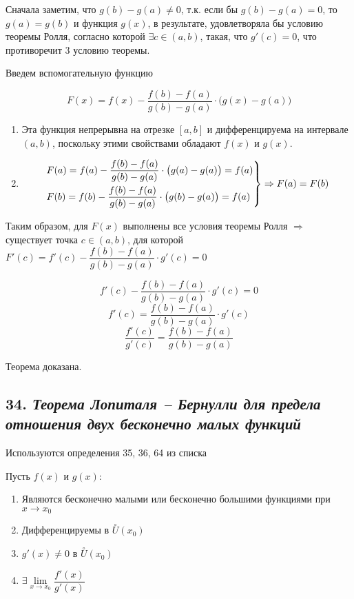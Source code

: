 Сначала заметим, что $g(b) - g(a) \neq 0$, т.к. если бы $g(b) - g(a) = 0$, то $g(a) = g(b)$ и функция $g(x)$, в результате, удовлетворяла бы условию теоремы Ролля, согласно которой $\exists c \in (a, b)$, такая, что $g'(c) = 0$, что противоречит 3 условию теоремы.

Введем вспомогательную функцию

$$
F(x) = f(x) - \dfrac{f(b) - f(a)}{g(b)-g(a)}\cdot \big(g(x) - g(a)\big)
$$
\begin{enumerate}

\item Эта функция непрерывна на отрезке $[a, b]$ и дифференцируема на интервале $(a, b)$, поскольку этими свойствами обладают $f(x)$ и $g(x)$.
\item $$\begin{rcases}
        F(a) = f(a) - {\dfrac{f(b) - f(a)}{g(b)-g(a)}}\cdot \big(g(a) - g(a)\big) = f(a)\\
        F(b) = f(b) - {\dfrac{f(b) - f(a)}{g(b)-g(a)}}\cdot \big(g(b) - g(a)\big) = f(a)
    \end{rcases}
    \Rightarrow F(a) = F(b)
    $$

\end{enumerate}

Таким образом, для $F(x)$ выполнены все условия теоремы Ролля $\Rightarrow$ существует точка $c \in (a, b)$, для которой $F'(c) = f'(c) - {\dfrac{f(b) - f(a)}{g(b)-g(a)}}\cdot g'(c) = 0$

$$f'(c) - {\dfrac{f(b) - f(a)}{g(b)-g(a)}}\cdot g'(c) = 0$$ $$f'(c) = {\dfrac{f(b) - f(a)}{g(b)-g(a)}}\cdot g'(c)$$ $$\dfrac{f'(c)}{g'(c)}=\dfrac{f(b) - f(a)}{g(b)-g(a)}$$

Теорема доказана.
\newpage 
\subsection*{34. \textit{Теорема Лопиталя – Бернулли для предела отношения двух бесконечно малых функций}}
\begin{Quote2} 
\small\centering 

Используются определения 35, 36, 64 из списка \end{Quote2} 

Пусть $f(x)$ и $g(x)$:
\begin{enumerate}

\item Являются бесконечно малыми или бесконечно большими функциями при $x \rightarrow x_0$
\item Дифференцируемы в $\overset{\circ}U(x_0)$
\item $g'(x) \neq 0$ в $\overset{\circ}U(x_0)$
\item $\exists \lim\limits_{x \rightarrow x_0}{\dfrac{f'(x)}{g'(x)}}$

\end{enumerate}


